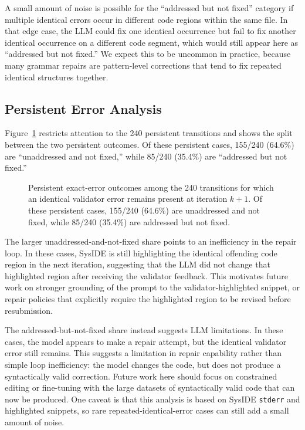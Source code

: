 A small amount of noise is possible for the ``addressed but not fixed'' category if multiple identical errors occur in different code regions within the same file. In that edge case, the LLM could fix one identical occurrence but fail to fix another identical occurrence on a different code segment, which would still appear here as ``addressed but not fixed.'' We expect this to be uncommon in practice, because many grammar repairs are pattern-level corrections that tend to fix repeated identical structures together.

\subsection{Persistent Error Analysis}
Figure~\ref{fig:appendix_persistent_transition_outcomes} restricts attention to the 240 persistent transitions and shows the split between the two persistent outcomes. Of these persistent cases, 155/240 (64.6\%) are ``unaddressed and not fixed,'' while 85/240 (35.4\%) are ``addressed but not fixed.''

\begin{figure}[H]
\centering

\caption{Persistent exact-error outcomes among the 240 transitions for which an identical validator error remains present at iteration \(k+1\). Of these persistent cases, 155/240 (64.6\%) are unaddressed and not fixed, while 85/240 (35.4\%) are addressed but not fixed.}
\label{fig:appendix_persistent_transition_outcomes}
\end{figure}

The larger unaddressed-and-not-fixed share points to an inefficiency in the repair loop. In these cases, SysIDE is still highlighting the identical offending code region in the next iteration, suggesting that the LLM did not change that highlighted region after receiving the validator feedback. This motivates future work on stronger grounding of the prompt to the validator-highlighted snippet, or repair policies that explicitly require the highlighted region to be revised before resubmission.

The addressed-but-not-fixed share instead suggests LLM limitations. In these cases, the model appears to make a repair attempt, but the identical validator error still remains. This suggests a limitation in repair capability rather than simple loop inefficiency: the model changes the code, but does not produce a syntactically valid correction. Future work here should focus on constrained editing or fine-tuning with the large datasets of syntactically valid code that can now be produced. One caveat is that this analysis is based on SysIDE \texttt{stderr} and highlighted snippets, so rare repeated-identical-error cases can still add a small amount of noise.
